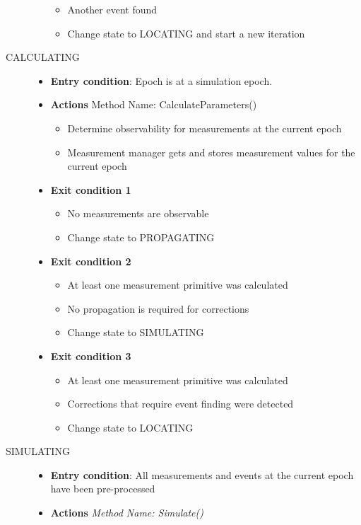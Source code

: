 \begin{description}
\begin{itemize}
\begin{itemize}
\item Another event found
\item Change state to LOCATING and start a new iteration
\end{itemize}
\end{itemize}
\item [CALCULATING]\hspace{1pt}
\begin{itemize}
\item \textbf{Entry condition}:  Epoch is at a simulation epoch.
\item \textbf{Actions} Method Name:  CalculateParameters()
\begin{itemize}
\item Determine observability for measurements at the current epoch
\item Measurement manager gets and stores measurement values for the current epoch
\end{itemize}
\item \textbf{Exit condition 1}
\begin{itemize}
\item No measurements are observable
\item Change state to PROPAGATING
\end{itemize}
\item \textbf{Exit condition 2}
\begin{itemize}
\item At least one measurement primitive was calculated
\item No propagation is required for corrections
\item Change state to SIMULATING
\end{itemize}
\item \textbf{Exit condition 3}
\begin{itemize}
\item At least one measurement primitive was calculated
\item Corrections that require event finding were detected
\item Change state to LOCATING
\end{itemize}
\end{itemize}
\item [SIMULATING]\hspace{1pt}
\begin{itemize}
\item \textbf{Entry condition}:
All measurements and events at the current epoch have been pre-processed
\item \textbf{Actions} \textit{Method Name:  Simulate()}

\end{itemize}
\end{description}
